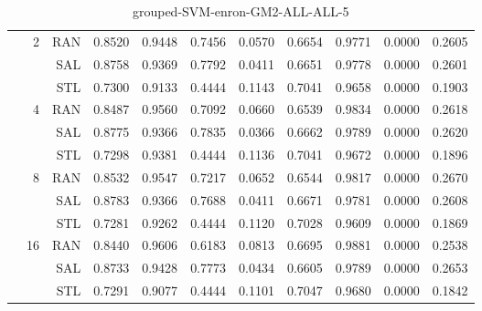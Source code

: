 \begin{center}
\begin{table}[htbp]
\begin{center}
\begin{tabular}{ | r | r | r | r | r | r | r | r | r | r | r |}
 & \multirow{3}{*}{2} & RAN & 0.8520 & 0.9448 & 0.7456 & 0.0570 & 0.6654 & 0.9771 & 0.0000 & 0.2605\\ \cline{3-11}
 &   & SAL & 0.8758 & 0.9369 & 0.7792 & 0.0411 & 0.6651 & 0.9778 & 0.0000 & 0.2601\\ \cline{3-11}
 &   & STL & 0.7300 & 0.9133 & 0.4444 & 0.1143 & 0.7041 & 0.9658 & 0.0000 & 0.1903\\ \cline{2-11}
 & \multirow{3}{*}{4} & RAN & 0.8487 & 0.9560 & 0.7092 & 0.0660 & 0.6539 & 0.9834 & 0.0000 & 0.2618\\ \cline{3-11}
 &   & SAL & 0.8775 & 0.9366 & 0.7835 & 0.0366 & 0.6662 & 0.9789 & 0.0000 & 0.2620\\ \cline{3-11}
 &   & STL & 0.7298 & 0.9381 & 0.4444 & 0.1136 & 0.7041 & 0.9672 & 0.0000 & 0.1896\\ \cline{2-11}
 & \multirow{3}{*}{8} & RAN & 0.8532 & 0.9547 & 0.7217 & 0.0652 & 0.6544 & 0.9817 & 0.0000 & 0.2670\\ \cline{3-11}
 &   & SAL & 0.8783 & 0.9366 & 0.7688 & 0.0411 & 0.6671 & 0.9781 & 0.0000 & 0.2608\\ \cline{3-11}
 &   & STL & 0.7281 & 0.9262 & 0.4444 & 0.1120 & 0.7028 & 0.9609 & 0.0000 & 0.1869\\ \cline{2-11}
 & \multirow{3}{*}{16} & RAN & 0.8440 & 0.9606 & 0.6183 & 0.0813 & 0.6695 & 0.9881 & 0.0000 & 0.2538\\ \cline{3-11}
 &   & SAL & 0.8733 & 0.9428 & 0.7773 & 0.0434 & 0.6605 & 0.9789 & 0.0000 & 0.2653\\ \cline{3-11}
 &   & STL & 0.7291 & 0.9077 & 0.4444 & 0.1101 & 0.7047 & 0.9680 & 0.0000 & 0.1842\\ \cline{2-11}
\hline
\end{tabular}
\caption{grouped-SVM-enron-GM2-ALL-ALL-5}
\end{center}
 \end{table}
\end{center}

